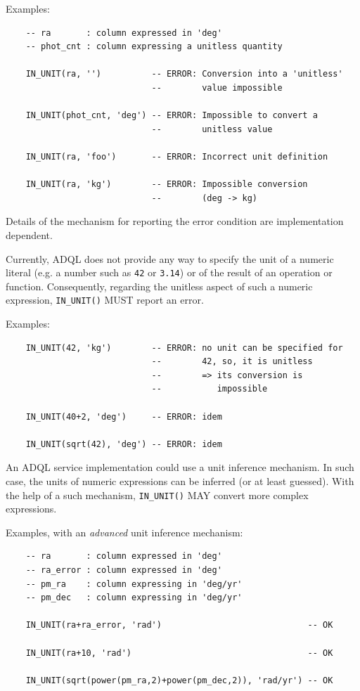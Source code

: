 \documentclass[11pt,a4paper]{ivoa}
\begin{document}
Examples:

\begin{verbatim}
    -- ra       : column expressed in 'deg'
    -- phot_cnt : column expressing a unitless quantity

    IN_UNIT(ra, '')          -- ERROR: Conversion into a 'unitless'
                             --        value impossible

    IN_UNIT(phot_cnt, 'deg') -- ERROR: Impossible to convert a
                             --        unitless value

    IN_UNIT(ra, 'foo')       -- ERROR: Incorrect unit definition

    IN_UNIT(ra, 'kg')        -- ERROR: Impossible conversion
                             --        (deg -> kg)
\end{verbatim}

Details of the mechanism for reporting the error condition are implementation
dependent.

Currently, ADQL does not provide any way to specify the unit of a numeric
literal (e.g. a number such as \verb:42: or \verb:3.14:) or of the result of an
operation or function. Consequently, regarding the unitless aspect of such
a numeric expression, \verb:IN_UNIT(): MUST report an error.

Examples:

\begin{verbatim}
    IN_UNIT(42, 'kg')        -- ERROR: no unit can be specified for
                             --        42, so, it is unitless
                             --        => its conversion is
                             --           impossible

    IN_UNIT(40+2, 'deg')     -- ERROR: idem

    IN_UNIT(sqrt(42), 'deg') -- ERROR: idem
\end{verbatim}

An ADQL service implementation could use a unit inference mechanism. In such
case, the units of numeric expressions can be inferred (or at least
guessed). With the
help of a such mechanism, \verb:IN_UNIT(): MAY convert more complex
expressions.

Examples, with an \emph{advanced} unit inference mechanism:

\begin{verbatim}
    -- ra       : column expressed in 'deg'
    -- ra_error : column expressed in 'deg'
    -- pm_ra    : column expressing in 'deg/yr'
    -- pm_dec   : column expressing in 'deg/yr'

    IN_UNIT(ra+ra_error, 'rad')                             -- OK

    IN_UNIT(ra+10, 'rad')                                   -- OK

    IN_UNIT(sqrt(power(pm_ra,2)+power(pm_dec,2)), 'rad/yr') -- OK
\end{verbatim}
\end{document}
